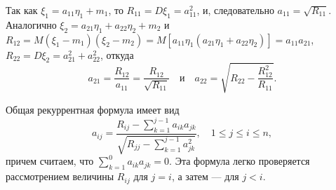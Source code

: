 \documentclass[bachelor, och, pract3]{SCWorks}
\begin{document}
Так как \(\xi_1 = a_{11}\eta_1 + m_1\), то \(R_{11} = D\xi_1 = a_{11}^2\), и, следовательно \(a_{11} = \sqrt{R_{11}}\). Аналогично \(\xi_2 = a_{21}\eta_1 + a_{22}\eta_2 + m_2\) и \(R_{12} = M(\xi_1 - m_1)(\xi_2 - m_2) = M[a_{11}\eta_1(a_{21}\eta_1 + a_{22}\eta_2)] = a_{11} a_{21}\), \(R_{22} = D\xi_2 = a_{21}^2 + a_{22}^2\), откуда
\[ a_{21} = \frac{R_{12}}{a_{11}} = \frac{R_{12}}{\sqrt{R_{11}}} \quad \text{и} \quad a_{22} = \sqrt{R_{22} - \frac{R_{12}^2}{R_{11}}}. \]

Общая рекуррентная формула имеет вид
\[ a_{ij} = \frac{R_{ij} - \sum_{k=1}^{j-1} a_{ik} a_{jk}}{\sqrt{R_{jj} - \sum_{k=1}^{j-1}a_{jk}^2}}, \quad 1 \le j \le i \le n, \]
причем считаем, что \(\sum_{k=1}^{0} a_{ik} a_{jk} = 0\). Эта формула легко проверяется рассмотрением величины \(R_{ij}\) для \(j=i\), а затем --- для \(j<i\).
\end{document}
